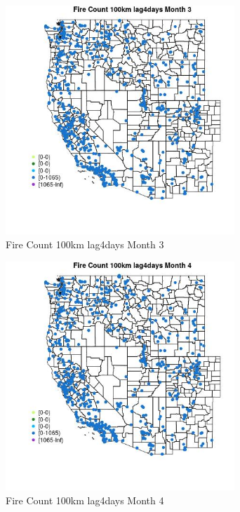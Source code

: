 \begin{figure} 
\centering  
\includegraphics[width=0.77\textwidth]{Code_Outputs/Report_ML_input_PM25_Step4_part_f_de_duplicated_aveswNAs_MapObsMo3Fire_Count_100km_lag4days.jpg} 
\caption{\label{fig:Report_ML_input_PM25_Step4_part_f_de_duplicated_aveswNAsMapObsMo3Fire_Count_100km_lag4days}Fire Count 100km lag4days Month 3} 
\end{figure} 
 

\begin{figure} 
\centering  
\includegraphics[width=0.77\textwidth]{Code_Outputs/Report_ML_input_PM25_Step4_part_f_de_duplicated_aveswNAs_MapObsMo4Fire_Count_100km_lag4days.jpg} 
\caption{\label{fig:Report_ML_input_PM25_Step4_part_f_de_duplicated_aveswNAsMapObsMo4Fire_Count_100km_lag4days}Fire Count 100km lag4days Month 4} 
\end{figure} 
 

